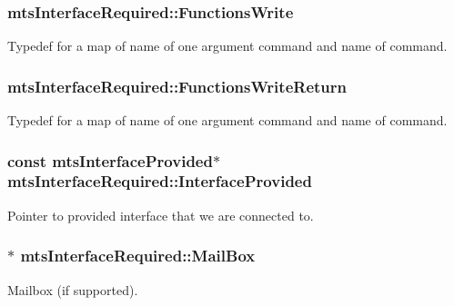 \subsubsection[{Functions\+Write}]{ mts\+Interface\+Required\+::\+Functions\+Write\hspace{0.3cm}{\ttfamily [protected]}}\label{classmts_interface_required_af065f884f6aaac85d342b49bf6673528}
Typedef for a map of name of one argument command and name of command. \hypertarget{classmts_interface_required_a4ce7797bea9968322e404e09a289196f}{}
\subsubsection[{Functions\+Write\+Return}]{ mts\+Interface\+Required\+::\+Functions\+Write\+Return\hspace{0.3cm}{\ttfamily [protected]}}\label{classmts_interface_required_a4ce7797bea9968322e404e09a289196f}
Typedef for a map of name of one argument command and name of command. \hypertarget{classmts_interface_required_a9c35d946a1e0308d32495e94ba90978e}{}
\subsubsection[{Interface\+Provided}]{\setlength{\rightskip}{0pt plus 5cm}const {\bf mts\+Interface\+Provided}$\ast$ mts\+Interface\+Required\+::\+Interface\+Provided\hspace{0.3cm}{\ttfamily [protected]}}\label{classmts_interface_required_a9c35d946a1e0308d32495e94ba90978e}
Pointer to provided interface that we are connected to. \hypertarget{classmts_interface_required_a449f33d73348d11900eead13f009b89c}{}
\subsubsection[{Mail\+Box}]{$\ast$ mts\+Interface\+Required\+::\+Mail\+Box\hspace{0.3cm}{\ttfamily [protected]}}\label{classmts_interface_required_a449f33d73348d11900eead13f009b89c}
Mailbox (if supported). \hypertarget{classmts_interface_required_a7e9f87dc80d231cab9df4bb446df964a}{}
